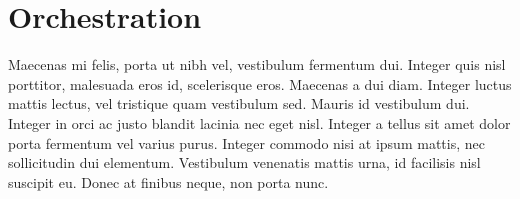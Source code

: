 \documentclass[10pt,a4paper]{article}
\begin{document}
\section{Orchestration}
Maecenas mi felis, porta ut nibh vel, vestibulum fermentum dui. Integer quis nisl porttitor, malesuada eros id, scelerisque eros. Maecenas a dui diam. Integer luctus mattis lectus, vel tristique quam vestibulum sed. Mauris id vestibulum dui. Integer in orci ac justo blandit lacinia nec eget nisl. Integer a tellus sit amet dolor porta fermentum vel varius purus. Integer commodo nisi at ipsum mattis, nec sollicitudin dui elementum. Vestibulum venenatis mattis urna, id facilisis nisl suscipit eu. Donec at finibus neque, non porta nunc.
\end{document}
